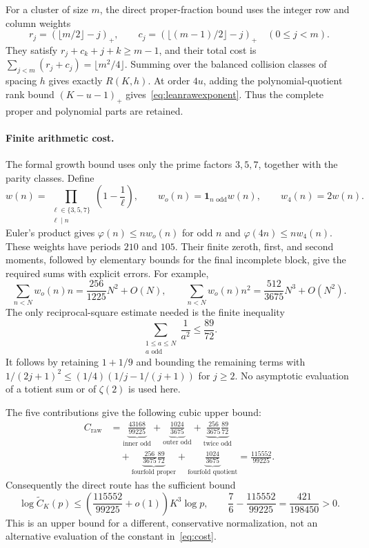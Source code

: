 \documentclass[11pt,letterpaper]{article}
\numberwithin{equation}{section}
\theoremstyle{remark}\newtheorem{remark}[theorem]{Remark}
\begin{document}
For a cluster of size $m$, the direct proper-fraction bound uses the integer
row and column weights
\begin{equation*}
 r_j=(\lfloor m/2\rfloor-j)_+,
 \qquad c_j=(\lfloor(m-1)/2\rfloor-j)_+\quad(0\le j<m).
\end{equation*}
They satisfy $r_j+c_k+j+k\ge m-1$, and their total cost is
$\sum_{j<m}(r_j+c_j)=\lfloor m^2/4\rfloor$.
Summing over the balanced collision classes of spacing $h$ gives exactly
$R(K,h)$. At order $4u$, adding the polynomial-quotient rank bound
$(K-u-1)_+$ gives~\eqref{eq:leanrawexponent}. Thus the complete proper and
polynomial parts are retained.

\paragraph{Finite arithmetic cost.}
The formal growth bound uses only the prime factors $3,5,7$, together with
the parity classes. Define
\begin{equation*}
 w(n)=\prod_{\substack{\ell\in\{3,5,7\}\\\ell\mid n}}
       \left(1-\frac1\ell\right),\qquad
 w_o(n)=\mathbf1_{n\text{ odd}}w(n),\qquad w_4(n)=2w(n).
\end{equation*}
Euler's product gives $\varphi(n)\le n w_o(n)$ for odd $n$ and
$\varphi(4n)\le n w_4(n)$. These weights have periods $210$ and $105$.
Their finite zeroth, first, and second moments, followed by elementary
bounds for the final incomplete block, give the required sums with explicit
errors. For example,
\begin{equation*}
 \sum_{n<N}w_o(n)n=\frac{256}{1225}N^2+O(N),\qquad
 \sum_{n<N}w_o(n)n^2=\frac{512}{3675}N^3+O(N^2).
\end{equation*}
The only reciprocal-square estimate needed is the finite inequality
\begin{equation*}
 \sum_{\substack{1\le a\le N\\a\text{ odd}}}\frac1{a^2}
 \le\frac{89}{72}.
\end{equation*}
It follows by retaining $1+1/9$ and bounding the remaining terms with
$1/(2j+1)^2\le(1/4)(1/j-1/(j+1))$ for $j\ge2$.
No asymptotic evaluation of a totient sum or of $\zeta(2)$ is used here.

The five contributions give the following cubic upper bound:
\begin{align*}
 C_{\mathrm{raw}}
 &=\underbrace{\frac{43168}{99225}}_{\text{inner odd}}
 +\underbrace{\frac{1024}{3675}}_{\text{outer odd}}
 +\underbrace{\frac{256}{3675}\frac{89}{72}}_{\text{twice odd}}\\
 &\quad+\underbrace{\frac{256}{3675}\frac{89}{72}}_{\text{fourfold proper}}
 +\underbrace{\frac{1024}{3675}}_{\text{fourfold quotient}}
 =\frac{115552}{99225}.
\end{align*}
Consequently the direct route has the sufficient bound
\begin{equation*}
 \log\widetilde C_K(p)
 \le\left(\frac{115552}{99225}+o(1)\right)K^3\log p,
 \qquad
 \frac76-\frac{115552}{99225}=\frac{421}{198450}>0.
\end{equation*}
This is an upper bound for a different, conservative normalization, not an
alternative evaluation of the constant in~\eqref{eq:cost}.
\end{document}
